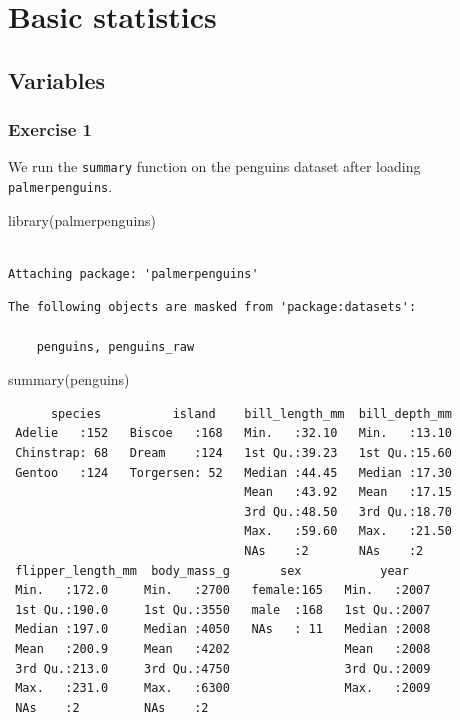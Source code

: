 \documentclass[
  letterpaper,
  DIV=11,
  numbers=noendperiod]{scrreprt}
\newenvironment{Shaded}{\begin{snugshade}}{\end{snugshade}}
\newcommand{\FunctionTok}[1]{\textcolor[rgb]{0.28,0.35,0.67}{#1}}
\newcommand{\NormalTok}[1]{\textcolor[rgb]{0.00,0.23,0.31}{#1}}
\begin{document}
\chapter{Basic statistics}\label{basic-statistics}

\section{Variables}\label{variables-1}

\subsection{Exercise 1}\label{exercise-1-4}

We run the \texttt{summary} function on the penguins dataset after
loading \texttt{palmerpenguins}.

\begin{Shaded}
\begin{Highlighting}[]
\FunctionTok{library}\NormalTok{(palmerpenguins)}
\end{Highlighting}
\end{Shaded}

\begin{verbatim}

Attaching package: 'palmerpenguins'
\end{verbatim}

\begin{verbatim}
The following objects are masked from 'package:datasets':

    penguins, penguins_raw
\end{verbatim}

\begin{Shaded}
\begin{Highlighting}[]
\FunctionTok{summary}\NormalTok{(penguins)}
\end{Highlighting}
\end{Shaded}

\begin{verbatim}
      species          island    bill_length_mm  bill_depth_mm  
 Adelie   :152   Biscoe   :168   Min.   :32.10   Min.   :13.10  
 Chinstrap: 68   Dream    :124   1st Qu.:39.23   1st Qu.:15.60  
 Gentoo   :124   Torgersen: 52   Median :44.45   Median :17.30  
                                 Mean   :43.92   Mean   :17.15  
                                 3rd Qu.:48.50   3rd Qu.:18.70  
                                 Max.   :59.60   Max.   :21.50  
                                 NAs    :2       NAs    :2      
 flipper_length_mm  body_mass_g       sex           year     
 Min.   :172.0     Min.   :2700   female:165   Min.   :2007  
 1st Qu.:190.0     1st Qu.:3550   male  :168   1st Qu.:2007  
 Median :197.0     Median :4050   NAs   : 11   Median :2008  
 Mean   :200.9     Mean   :4202                Mean   :2008  
 3rd Qu.:213.0     3rd Qu.:4750                3rd Qu.:2009  
 Max.   :231.0     Max.   :6300                Max.   :2009  
 NAs    :2         NAs    :2                                 
\end{verbatim}
\end{document}
